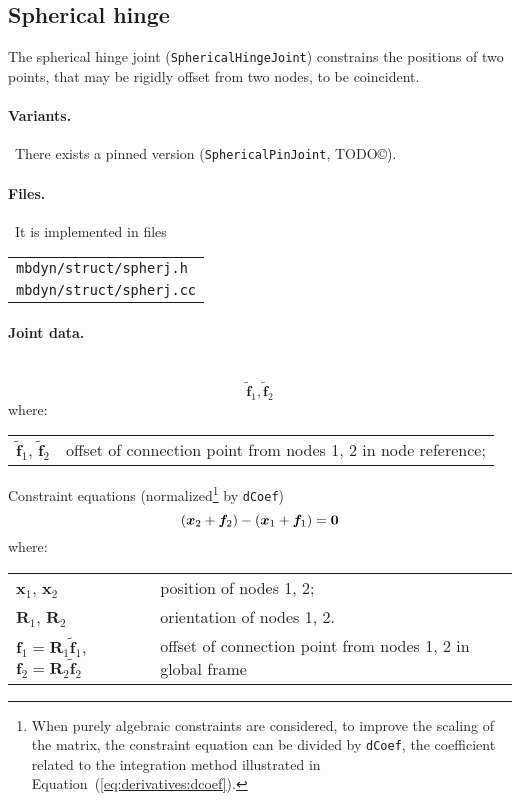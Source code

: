 \documentclass[10pt,dvips,fleqn,subeqn]{report}
\newcommand{\T}[1]{\bm{#1}}
\begin{document}
\subsection{Spherical hinge}
The spherical hinge joint (\texttt{SphericalHingeJoint}) constrains the positions
of two points, that may be rigidly offset from two nodes, to be coincident.

\paragraph{Variants.} \
There exists a pinned version (\texttt{SphericalPinJoint}, TODO\copyright).

\paragraph{Files.} \
It is implemented in files

\begin{tabular}{l}
\texttt{mbdyn/struct/spherj.h} \\
\texttt{mbdyn/struct/spherj.cc}
\end{tabular}

\paragraph{Joint data.} \
\begin{equation}
	\tilde{\T{f}}_1, \tilde{\T{f}}_2
\end{equation}
where:

\noindent
\begin{tabular}{ll}
$\tilde{\T{f}}_1$, $\tilde{\T{f}}_2$ & offset of connection point from nodes 1, 2 in node reference; \\
\end{tabular}

\noindent
Constraint equations (normalized\footnote{When purely algebraic
constraints are considered, to improve the scaling of the matrix,
the constraint equation can be divided by \texttt{dCoef},
the coefficient related to the integration method illustrated 
in Equation~(\ref{eq:derivatives:dcoef}).
} by \texttt{dCoef})
\begin{equation}
	\plbr{\T{x}_2 + \T{f}_2} - \plbr{\T{x}_1 + \T{f}_1} = \T{0}
\end{equation}
where:

\noindent
\begin{tabular}{ll}
$\T{x}_1$, $\T{x}_2$ & position of nodes 1, 2; \\
$\T{R}_1$, $\T{R}_2$ & orientation of nodes 1, 2.\\
$\T{f}_1 = \T{R}_1 \tilde{\T{f}}_1$, $\T{f}_2 = \T{R}_2 \tilde{\T{f}}_2$ & offset of connection point from nodes 1, 2 in global frame
\end{tabular}
\end{document}
